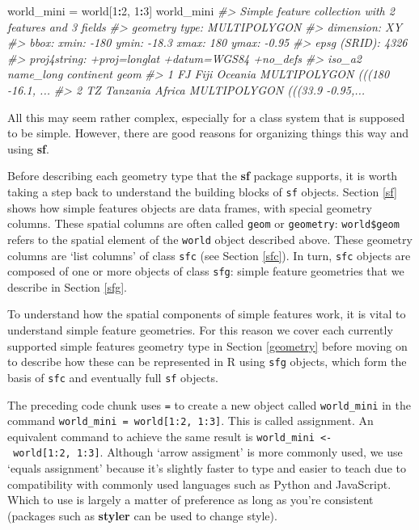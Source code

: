 \documentclass[]{krantz}
\newenvironment{Shaded}{\begin{snugshade}}{\end{snugshade}}
\newcommand{\CommentTok}[1]{\textcolor[rgb]{0.37,0.37,0.37}{\textit{#1}}}
\newcommand{\DecValTok}[1]{\textcolor[rgb]{0.06,0.06,0.06}{#1}}
\newcommand{\NormalTok}[1]{#1}
\newcommand{\OperatorTok}[1]{\textcolor[rgb]{0.43,0.43,0.43}{\textbf{#1}}}
\newcommand{\StringTok}[1]{\textcolor[rgb]{0.5,0.5,0.5}{#1}}
\let\BeginKnitrBlock\begin \let\EndKnitrBlock\end
\begin{document}
\begin{Shaded}
\begin{Highlighting}[]
\NormalTok{world_mini =}\StringTok{ }\NormalTok{world[}\DecValTok{1}\OperatorTok{:}\DecValTok{2}\NormalTok{, }\DecValTok{1}\OperatorTok{:}\DecValTok{3}\NormalTok{]}
\NormalTok{world_mini}
\CommentTok{#> Simple feature collection with 2 features and 3 fields}
\CommentTok{#> geometry type:  MULTIPOLYGON}
\CommentTok{#> dimension:      XY}
\CommentTok{#> bbox:           xmin: -180 ymin: -18.3 xmax: 180 ymax: -0.95}
\CommentTok{#> epsg (SRID):    4326}
\CommentTok{#> proj4string:    +proj=longlat +datum=WGS84 +no_defs}
\CommentTok{#>   iso_a2 name_long continent                           geom}
\CommentTok{#> 1     FJ      Fiji   Oceania MULTIPOLYGON (((180 -16.1, ...}
\CommentTok{#> 2     TZ  Tanzania    Africa MULTIPOLYGON (((33.9 -0.95,...}
\end{Highlighting}
\end{Shaded}

All this may seem rather complex, especially for a class system that is supposed to be simple.
However, there are good reasons for organizing things this way and using \textbf{sf}.

Before describing each geometry type that the \textbf{sf} package supports, it is worth taking a step back to understand the building blocks of \texttt{sf} objects.
Section \ref{sf} shows how simple features objects are data frames, with special geometry columns.
These spatial columns are often called \texttt{geom} or \texttt{geometry}: \texttt{world\$geom} refers to the spatial element of the \texttt{world} object described above.
These geometry columns are `list columns' of class \texttt{sfc} (see Section \ref{sfc}).
In turn, \texttt{sfc} objects are composed of one or more objects of class \texttt{sfg}: simple feature geometries that we describe in Section \ref{sfg}.

To understand how the spatial components of simple features work, it is vital to understand simple feature geometries.
For this reason we cover each currently supported simple features geometry type in Section \ref{geometry} before moving on to describe how these can be represented in R using \texttt{sfg} objects, which form the basis of \texttt{sfc} and eventually full \texttt{sf} objects.

\BeginKnitrBlock{rmdnote}
The preceding code chunk uses \texttt{=} to create a new object called \texttt{world\_mini} in the command \texttt{world\_mini\ =\ world{[}1:2,\ 1:3{]}}.
This is called assignment.
An equivalent command to achieve the same result is \texttt{world\_mini\ \textless{}-\ world{[}1:2,\ 1:3{]}}.
Although `arrow assigment' is more commonly used, we use `equals assignment' because it's slightly faster to type and easier to teach due to compatibility with commonly used languages such as Python and JavaScript.
Which to use is largely a matter of preference as long as you're consistent (packages such as \textbf{styler} can be used to change style).
\EndKnitrBlock{rmdnote}
\end{document}
